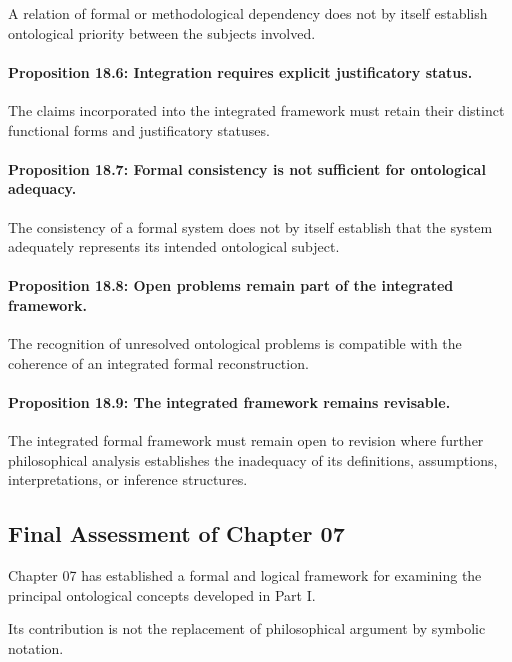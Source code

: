 A relation
of formal
or methodological
dependency does
not by
itself establish
ontological priority
between the
subjects involved.

\paragraph{Proposition 18.6: Integration requires explicit justificatory status.}

The claims
incorporated into
the integrated
framework must
retain their
distinct functional
forms and
justificatory statuses.

\paragraph{Proposition 18.7: Formal consistency is not sufficient for ontological adequacy.}

The consistency
of a
formal system
does not
by itself
establish that
the system
adequately represents
its intended
ontological subject.

\paragraph{Proposition 18.8: Open problems remain part of the integrated framework.}

The recognition
of unresolved
ontological problems
is compatible
with the
coherence of
an integrated
formal reconstruction.

\paragraph{Proposition 18.9: The integrated framework remains revisable.}

The integrated
formal framework
must remain
open to
revision where
further philosophical
analysis establishes
the inadequacy
of its
definitions, assumptions,
interpretations, or
inference structures.

\subsection{Final Assessment of Chapter 07}

Chapter 07 has
established a
formal and
logical framework
for examining
the principal
ontological concepts
developed in
Part I.

Its contribution
is not
the replacement
of philosophical
argument by
symbolic notation.

